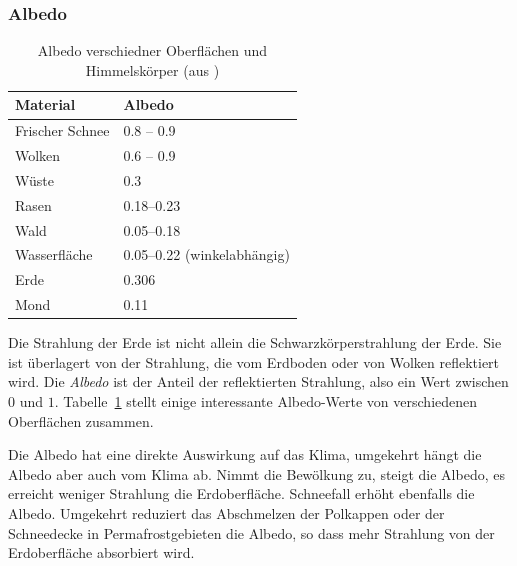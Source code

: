 \subsubsection{Albedo}
\begin{table}
\centering
\begin{tabular}{|l|l|}
\hline
Material&Albedo\\
\hline
Frischer Schnee&0.8 -- 0.9\\
Wolken         &0.6 -- 0.9\\
Wüste          &0.3\\
Rasen          &0.18--0.23\\
Wald           &0.05--0.18\\
Wasserfläche   &0.05--0.22 (winkelabhängig)\\
Erde           &0.306 \\
Mond           &0.11 \\
\hline
\end{tabular}
\caption{Albedo verschiedner Oberflächen und Himmelskörper
(aus \cite{skript:albeod})
\label{skript:albedotabelle}}
\end{table}
Die Strahlung der Erde ist nicht allein die Schwarzkörperstrahlung
der Erde.
Sie ist überlagert von der Strahlung, die vom Erdboden oder von
Wolken reflektiert wird.
Die {\em Albedo} ist der Anteil der reflektierten Strahlung, also ein
Wert zwischen $0$ und $1$.
Tabelle~\ref{skript:albedotabelle} stellt einige interessante
Albedo-Werte von verschiedenen Oberflächen zusammen.

Die Albedo hat eine direkte Auswirkung auf das Klima, umgekehrt
hängt die Albedo aber auch vom Klima ab.
Nimmt die Bewölkung zu, steigt die Albedo, es erreicht weniger 
Strahlung die Erdoberfläche.
Schneefall erhöht ebenfalls die Albedo.
Umgekehrt reduziert das Abschmelzen der Polkappen oder der
Schneedecke in Permafrostgebieten die Albedo, so dass mehr Strahlung
von der Erdoberfläche absorbiert wird.


